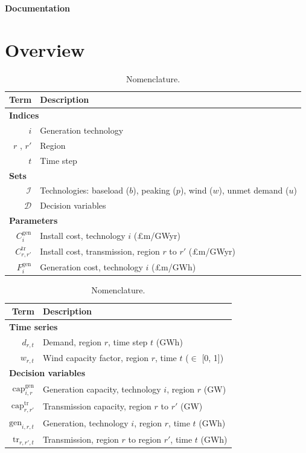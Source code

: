 \documentclass[preprint]{elsarticle}
\begin{document}
\noindent \textbf{Documentation}
\section{Overview}

\begin{table}
  \centering
  \small
\begin{tabular}{r p{5.3cm}}
  Term & Description \\ \hline
  \multicolumn{2}{l}{\textbf{Indices}} \\
  $i$ & Generation technology \\
  $r$ , $r'$ & Region \\
  $t$ & Time step \\
  \multicolumn{2}{l}{\textbf{Sets}} \\
  $\mathcal{I}$ & Technologies: baseload ($b$), peaking ($p$), wind ($w$), unmet demand ($u$) \\
  $\mathcal{D}$ & Decision variables \\
  \multicolumn{2}{l}{\textbf{Parameters}} \\
  $C_{i}^\text{gen}$ & Install cost, technology $i$ (\pounds m/GWyr)\\
  $C_{r, r'}^\text{tr}$ & Install cost, transmission, region $r$ to $r'$ (\pounds m/GWyr) \\
  $F_{i}^\text{gen}$ & Generation cost, technology $i$ (\pounds m/GWh) \\ \hline
\end{tabular} \hspace{0.5em}
\begin{tabular}{r p{3.7cm}}
  Term & Description \\ \hline
  \multicolumn{2}{l}{\textbf{Time series}} \\
  $d_{r, t}$ & Demand, region $r$, time step $t$ (GWh) \\
  $w_{r, t}$ & Wind capacity factor, region $r$, time $t$ ($\in$ [0, 1]) \\
  \multicolumn{2}{l}{\textbf{Decision variables}} \\
  $\text{cap}_{i, r}^\text{gen}$ & Generation capacity, technology $i$, region $r$ (GW) \\
  $\text{cap}_{r, r'}^\text{tr}$ & Transmission capacity, region $r$ to $r'$ (GW) \\
  $\text{gen}_{i, r, t}$ & Generation, technology $i$, region $r$, time $t$ (GWh) \\
  $\text{tr}_{r, r', t}$ & Transmission, region $r$ to region $r'$, time $t$ (GWh) \\ \hline
\end{tabular}
\caption{Nomenclature.}
\label{table:appendix:nomenclature}
\end{table}
\end{document}
